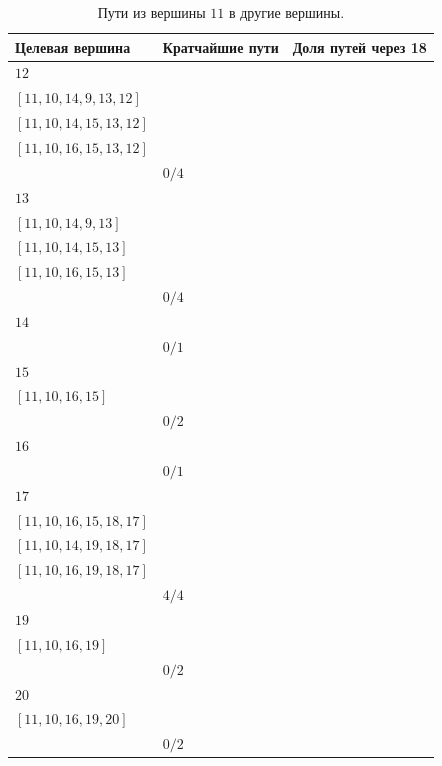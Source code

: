 \documentclass[12pt, a4paper]{extarticle}
\begin{document}
\begin{table}[h!]
    \caption{Пути из вершины $11$ в другие вершины.}
    \label{tbl:10-11}
    \begin{tabularx}{\textwidth}{|X|X|X|}
        \hline 
        Целевая вершина & Кратчайшие пути & Доля путей через 18 \\
        \hline 
        $12$ & \begin{tabular}{@{}l@{}} $[11, 10, 6, 9, 13, 12]$ \\  $[11, 10, 14, 9, 13, 12]$ \\  $[11, 10, 14, 15, 13, 12]$ \\  $[11, 10, 16, 15, 13, 12]$ \\ \end{tabular} & $0/4$ \\
        \hline
        $13$ & \begin{tabular}{@{}l@{}} $[11, 10, 6, 9, 13]$ \\  $[11, 10, 14, 9, 13]$ \\  $[11, 10, 14, 15, 13]$ \\  $[11, 10, 16, 15, 13]$ \\ \end{tabular} & $0/4$ \\
        \hline
        $14$ & \begin{tabular}{@{}l@{}} $[11, 10, 14]$ \\ \end{tabular} & $0/1$ \\
        \hline
        $15$ & \begin{tabular}{@{}l@{}} $[11, 10, 14, 15]$ \\  $[11, 10, 16, 15]$ \\ \end{tabular} & $0/2$ \\
        \hline
        $16$ & \begin{tabular}{@{}l@{}} $[11, 10, 16]$ \\ \end{tabular} & $0/1$ \\
        \hline
        $17$ & \begin{tabular}{@{}l@{}} $[11, 10, 14, 15, 18, 17]$ \\  $[11, 10, 16, 15, 18, 17]$ \\  $[11, 10, 14, 19, 18, 17]$ \\  $[11, 10, 16, 19, 18, 17]$ \\ \end{tabular} & $4/4$ \\
        \hline
        $19$ & \begin{tabular}{@{}l@{}} $[11, 10, 14, 19]$ \\  $[11, 10, 16, 19]$ \\ \end{tabular} & $0/2$ \\
        \hline
        $20$ & \begin{tabular}{@{}l@{}} $[11, 10, 14, 19, 20]$ \\  $[11, 10, 16, 19, 20]$ \\ \end{tabular} & $0/2$ \\
        \hline
    \end{tabularx}
\end{table}
\end{document}
